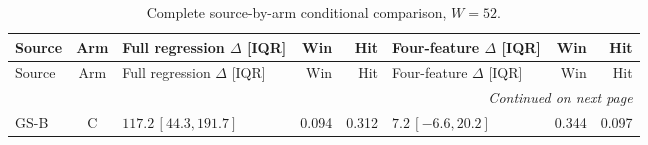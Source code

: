 \begingroup
\fontsize{9}{10.2}\selectfont
\setlength{\tabcolsep}{2.2pt}
\renewcommand{\arraystretch}{1.05}
\setlength{\LTpre}{2pt}
\setlength{\LTpost}{3pt}
\begin{longtable}{lcp{37mm}rrp{37mm}rr}
\caption{Complete source-by-arm conditional comparison, $W=52$.}\label{tab:v9-stability-w52}\\
\toprule
Source & Arm & Full regression $\Delta$ [IQR] & Win & Hit & Four-feature $\Delta$ [IQR] & Win & Hit\\
\midrule
\endfirsthead
\toprule
Source & Arm & Full regression $\Delta$ [IQR] & Win & Hit & Four-feature $\Delta$ [IQR] & Win & Hit\\
\midrule
\endhead
\midrule
\multicolumn{8}{r}{\emph{Continued on next page}}\\
\endfoot
\bottomrule
\endlastfoot
GS-B & C & \(117.2\,[44.3,191.7]\) & 0.094 & 0.312 & \(7.2\,[-6.6,20.2]\) & 0.344 & 0.097\\

\end{longtable}
